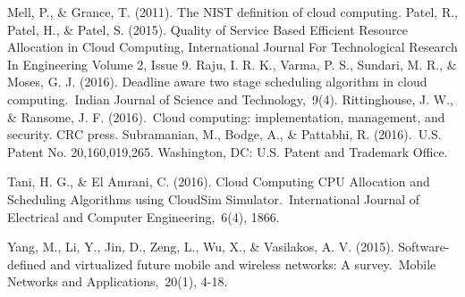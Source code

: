 \begin{thebibliography}{99}
\begin{LTRbibitems}
	Mell, P., \& Grance, T. (2011). The NIST definition of cloud computing.
	  Patel, R., Patel, H., \& Patel, S. (2015). Quality of Service Based Efficient Resource Allocation in Cloud Computing, International Journal For Technological Research In Engineering Volume 2, Issue 9.
	  Raju, I. R. K., Varma, P. S., Sundari, M. R., \& Moses, G. J. (2016). Deadline aware two stage scheduling algorithm in cloud computing. Indian Journal of Science and Technology, 9(4).
	Rittinghouse, J. W., \& Ransome, J. F. (2016). Cloud computing: implementation, management, and security. CRC press.
	 Subramanian, M., Bodge, A., \& Pattabhi, R. (2016). U.S. Patent No. 20,160,019,265. Washington, DC: U.S. Patent and Trademark Office.








	  Tani, H. G., \& El Amrani, C. (2016). Cloud Computing CPU Allocation and Scheduling Algorithms using CloudSim Simulator. International Journal of Electrical and Computer Engineering, 6(4), 1866.



	Yang, M., Li, Y., Jin, D., Zeng, L., Wu, X., \& Vasilakos, A. V. (2015). Software-defined and virtualized future mobile and wireless networks: A survey. Mobile Networks and Applications, 20(1), 4-18.

	\end{LTRbibitems}
\end{thebibliography}
